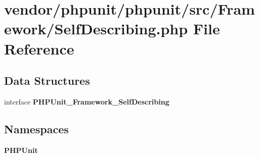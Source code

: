 \section{vendor/phpunit/phpunit/src/\+Framework/\+Self\+Describing.php File Reference}
\label{_self_describing_8php}
\subsection*{Data Structures}
\begin{DoxyCompactItemize}
\item 
interface {\bf P\+H\+P\+Unit\+\_\+\+Framework\+\_\+\+Self\+Describing}
\end{DoxyCompactItemize}
\subsection*{Namespaces}
\begin{DoxyCompactItemize}
\item 
 {\bf P\+H\+P\+Unit}
\end{DoxyCompactItemize}
